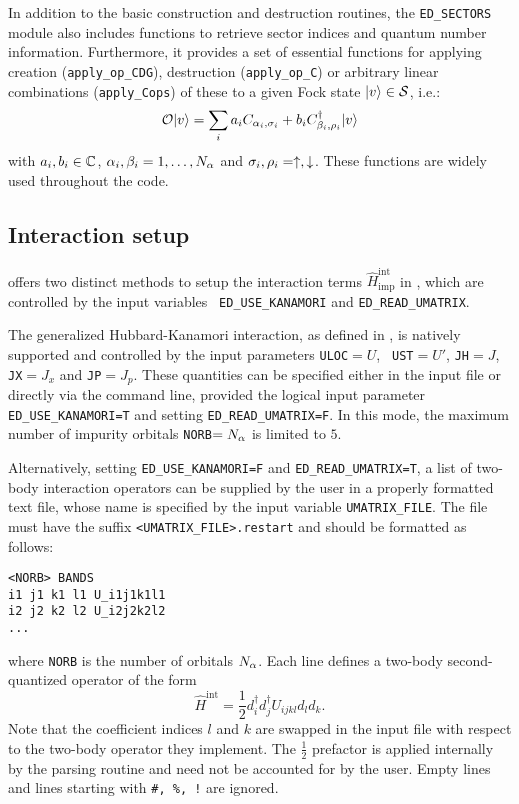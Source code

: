 \documentclass[edipack_sp.tex]{subfiles}
\begin{document}
In addition to the basic construction and destruction routines, the
{\tt ED\_SECTORS} module also includes functions to
retrieve sector indices and quantum number
information. Furthermore, it provides a set of
essential functions for applying creation ({\tt apply\_op\_CDG}), destruction ({\tt apply\_op\_C}) or arbitrary linear combinations
({\tt apply\_Cops}) of these to a given Fock state $|v\rangle\in{\cal S}$, i.e.:
$$
{\cal O}|v\rangle = \sum_i a_i C_{\alpha_i,\sigma_i}+ b_i C^{\dagger}_{\beta_i,\rho_i}|v\rangle
$$ 
with $a_i, b_i \in\mathbb{C}$, $\alpha_i,\beta_i=1,\dots,N_\alpha$ and $\sigma_i,\rho_i=\uparrow,\downarrow$. These functions are widely used throughout the code. 





















\subsection{Interaction setup}\label{sSecIntSetup}
\NAME offers two distinct methods to setup the interaction terms $\hat{H}^\mathrm{int}_\mathrm{imp}$ in , which are controlled by the input variables {\tt
  ED\_USE\_KANAMORI} and {\tt ED\_READ\_UMATRIX}. 
  
The generalized Hubbard-Kanamori interaction, as defined in , is natively
supported and controlled by the input parameters {\tt ULOC}$=U$, {\tt
  UST}$=U'$, {\tt JH}$=J$, {\tt JX}$=J_{x}$ and {\tt JP}$=J_{p}$.
These quantities can be specified either in the input file or directly
via the command line, provided the logical input parameter {\tt ED\_USE\_KANAMORI=T} and setting {\tt ED\_READ\_UMATRIX=F}. In this mode, the maximum number of impurity orbitals {\tt NORB}$=N_\alpha$ is limited to $5$.


Alternatively, setting {\tt ED\_USE\_KANAMORI=F} and {\tt ED\_READ\_UMATRIX=T}, a list of two-body interaction operators can be supplied by the user in a properly
formatted text file, whose name is specified by the input variable {\tt UMATRIX\_FILE}.  
The file must have the suffix {\tt <UMATRIX\_FILE>.re\-star\-t} and should be formatted as follows: 
\begin{lstlisting}[style=mybash,numbers=none]
<NORB> BANDS
i1 j1 k1 l1 U_i1j1k1l1
i2 j2 k2 l2 U_i2j2k2l2
...
\end{lstlisting}
where {\tt NORB} is the number of orbitals $N_\alpha$.
Each line defines a two-body second-quantized operator of the form 
$$
\hat{H}^{\mathrm{int}}=\frac{1}{2}d^{\dagger}_{i}d^{\dagger}_{j}U_{ijkl}d_{l}d_{k}.
$$
Note that the coefficient indices $l$ and $k$ are swapped in the input file with respect to the two-body operator they implement. The $\tfrac{1}{2}$ prefactor is applied internally by the parsing routine and need not be accounted for by the user.
Empty lines and lines starting with {\tt \#, \%, !} are ignored.
\end{document}
